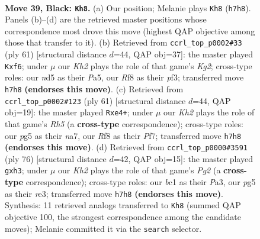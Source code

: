 \documentclass[11pt]{article}
\begin{document}
\clearpage

\begin{figure}[p]\centering
\begin{subfigure}{0.46\textwidth}\centering
\resizebox{\linewidth}{!}{%
\newchessgame
\chessboard[
  setfen={5r2/p6k/P2b3N/1P1N1pP1/8/8/3K4/R1B5 b - - 1 39},
  showmover=false,
  pgfstyle=straightmove, color=movearrow, markmove={h7-h8}
]}
\caption{}
\end{subfigure}\hfill
\begin{subfigure}{0.46\textwidth}\centering
\resizebox{\linewidth}{!}{%
\newchessgame
\chessboard[
  setfen={8/6k1/5N2/p1B1p2p/8/2P2P2/br4PP/4R1K1 b - - 0 31},
  showmover=false,
  pgfstyle=straightmove, color=movearrow, markmove={g7-f6}
]}
\caption{}
\end{subfigure}
\\[4pt]
\begin{subfigure}{0.46\textwidth}\centering
\resizebox{\linewidth}{!}{%
\newchessgame
\chessboard[
  setfen={8/N1k1pp2/6p1/2P5/1Pb1B2r/R7/5P2/4K3 b - - 0 31},
  showmover=false,
  pgfstyle=straightmove, color=movearrow, markmove={h4-e4}
]}
\caption{}
\end{subfigure}\hfill
\begin{subfigure}{0.46\textwidth}\centering
\resizebox{\linewidth}{!}{%
\newchessgame
\chessboard[
  setfen={6k1/5pp1/3B2np/8/1RP5/P3r2b/6P1/6K1 w - - 0 39},
  showmover=false,
  pgfstyle=straightmove, color=movearrow, markmove={g2-h3}
]}
\caption{}
\end{subfigure}
\caption{\textbf{Move 39, Black: \texttt{Kh8}.} (a) Our position; Melanie plays \texttt{Kh8} (\texttt{h7h8}). Panels (b)--(d) are the retrieved master positions whose correspondence most drove this move (highest QAP objective among those that transfer to it). (b) Retrieved from \texttt{ccrl\_top\_p0002\#33} (ply 61) [structural distance $d$=44, QAP obj=37]: the master played \texttt{Kxf6}; under $\mu$ our \emph{Kh2} plays the role of that game's \emph{Kg2}; cross-type roles: our \emph{n}d5 as their \emph{P}a5, our \emph{R}f8 as their \emph{p}f3; transferred move \texttt{h7h8} \textbf{(endorses this move)}. (c) Retrieved from \texttt{ccrl\_top\_p0002\#123} (ply 61) [structural distance $d$=44, QAP obj=19]: the master played \texttt{Rxe4+}; under $\mu$ our \emph{Kh2} plays the role of that game's \emph{Rh5} (a \textbf{cross-type} correspondence); cross-type roles: our \emph{p}g5 as their \emph{n}a7, our \emph{R}f8 as their \emph{P}f7; transferred move \texttt{h7h8} \textbf{(endorses this move)}. (d) Retrieved from \texttt{ccrl\_top\_p0000\#3591} (ply 76) [structural distance $d$=42, QAP obj=15]: the master played \texttt{gxh3}; under $\mu$ our \emph{Kh2} plays the role of that game's \emph{Pg2} (a \textbf{cross-type} correspondence); cross-type roles: our \emph{b}c1 as their \emph{P}a3, our \emph{p}g5 as their \emph{r}e3; transferred move \texttt{h7h8} \textbf{(endorses this move)}. Synthesis: 11 retrieved analogs transferred to \texttt{Kh8} (summed QAP objective 100, the strongest correspondence among the candidate moves); Melanie committed it via the \texttt{search} selector.}
\label{fig:thought-m77}
\end{figure}
\end{document}
